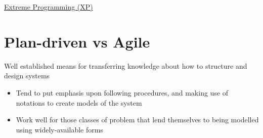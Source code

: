 \documentclass{article}[18pt]
\begin{document}
\begin{center}
\underline{\huge Extreme Programming (XP)}
\end{center}
\section{Plan-driven vs Agile}
\begin{defin}
Well established means for transferring knowledge about how to structure and design systems
\begin{itemize}
	\item Tend to put emphasis upon following procedures, and making use of notations to create models of the system
	\item Work well for those classes of problem that lend themselves to being modelled using widely-available forms
\end{itemize}
\end{defin}
\end{document}

